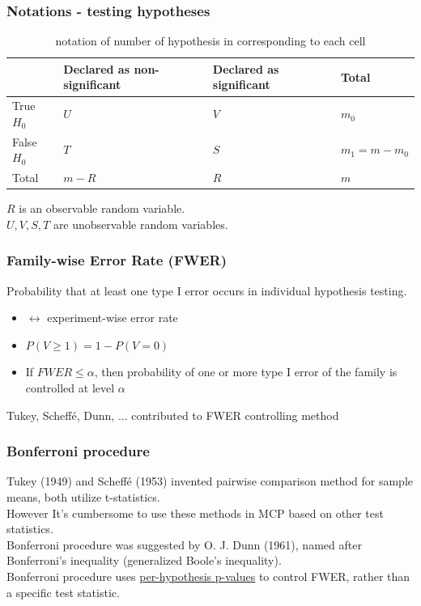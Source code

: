 \documentclass{beamer}
\begin{document}
\frame
{
  \frametitle{Notations - testing hypotheses}
    \begin{table}
    \small
    \setlength{\tabcolsep}{3pt}
\begin{tabularx}{\hsize}{@{}l LLL@{}}
    \toprule
 & Declared as non-significant  & Declared as significant & Total \\
    \midrule
True $H_0$ 
    & $U$ 
        & $V$ 
            & $m_0$ \\
False $H_0$ 
    & $T$ 
        & $S$
            &  $m_1=m-m_0$   \\
  
Total & $m-R$ 
        & $R$ 
            & $m$     \\
    \bottomrule
\end{tabularx}
\caption{notation of number of hypothesis in corresponding to each cell}
    \end{table}
    $R$ is an observable random variable.\vspace{0.1in}\\
    $U, V, S, T$ are unobservable random variables.
}


\frame
{
  \frametitle{\LARGE{Family-wise Error Rate (FWER)}}
    Probability that at least one type I error occurs in individual hypothesis testing.\vspace{0.1in}\\
    \begin{itemize}
      \item $\leftrightarrow$ experiment-wise error rate\vspace{0.1in}\\
      \item $P(V\geq1)=1-P(V=0)$\vspace{0.1in}\\
      \item If $FWER \leq \alpha$, then probability of one or more type I error of the family is controlled at level $\alpha$ \vspace{0.1in}\\
    \end{itemize}
    Tukey, Scheff\'e, Dunn, $...$ contributed to FWER controlling method
}

\frame
{
  \frametitle{Bonferroni procedure}
    Tukey (1949) and Scheff\'e (1953) invented pairwise comparison method for sample means, both utilize t-statistics.\vspace{0.07in}\\
    However It's cumbersome to use these methods in MCP based on other test statistics.\vspace{0.22in}\\
    Bonferroni procedure was suggested by O. J. Dunn (1961), named after Bonferroni's inequality (generalized Boole's inequality).\vspace{0.07in}\\
Bonferroni procedure uses \underline{per-hypothesis p-values} to control FWER, rather than a specific test statistic.
}
\end{document}
